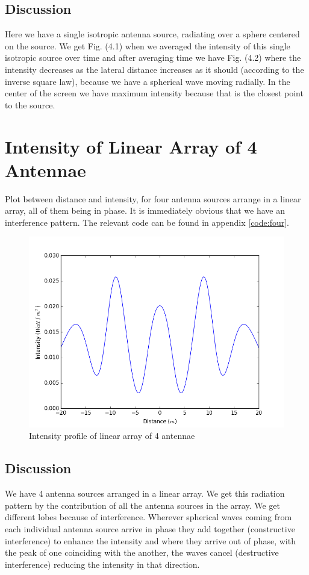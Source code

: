 \subsection{Discussion}

Here we have a single isotropic antenna source, radiating over a sphere centered on the source. We get Fig. (4.1) when we averaged the intensity of this single isotropic source over time and after averaging time we have Fig. (4.2) where the intensity decreases as the lateral distance increases as it should (according to the inverse square law), because we have a spherical wave moving radially. In the center of the screen we have maximum intensity because that is the closest point to the source. 


\section{Intensity of Linear Array of 4 Antennae}

Plot between distance and intensity, for four antenna sources arrange in a linear array, all of them being in phase. It is immediately obvious that we have an interference pattern. The relevant code can be found in appendix \ref{code:four}.

\begin{figure}[!h]
	\centering	
    \includegraphics[scale=0.45]{figure_3.png}
	\caption{Intensity profile of linear array of 4 antennae}
\end{figure}

\subsection{Discussion}
We have 4 antenna sources arranged in a linear array. We get this radiation pattern by the contribution of all the antenna sources in the array. We get different lobes because of interference. Wherever spherical waves coming from each individual antenna source arrive in phase they add together (constructive interference) to enhance the intensity and where they arrive out of phase, with the peak of one coinciding with the another, the waves cancel (destructive interference) reducing the intensity in that direction.

